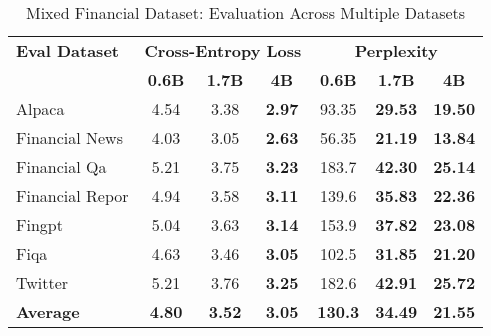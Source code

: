 
\begin{table}[h]
\centering
\caption[Mixed Financial: Evaluation Results]{Mixed Financial Dataset: Evaluation Across Multiple Datasets}
\label{tab:mixed_financial_results}
\begin{tabular}{l|ccc|ccc}
\hline
\textbf{Eval Dataset} & \multicolumn{3}{c|}{\textbf{Cross-Entropy Loss}} & \multicolumn{3}{c}{\textbf{Perplexity}} \\
\cline{2-4} \cline{5-7}
  & \textbf{0.6B} & \textbf{1.7B} & \textbf{4B} & \textbf{0.6B} & \textbf{1.7B} & \textbf{4B} \\
\hline
Alpaca & 4.54 & 3.38 & \textbf{2.97} & 93.35 & \textbf{29.53} & \textbf{19.50} \\
Financial News & 4.03 & 3.05 & \textbf{2.63} & 56.35 & \textbf{21.19} & \textbf{13.84} \\
Financial Qa & 5.21 & 3.75 & \textbf{3.23} & 183.7 & \textbf{42.30} & \textbf{25.14} \\
Financial Repor & 4.94 & 3.58 & \textbf{3.11} & 139.6 & \textbf{35.83} & \textbf{22.36} \\
Fingpt & 5.04 & 3.63 & \textbf{3.14} & 153.9 & \textbf{37.82} & \textbf{23.08} \\
Fiqa & 4.63 & 3.46 & \textbf{3.05} & 102.5 & \textbf{31.85} & \textbf{21.20} \\
Twitter & 5.21 & 3.76 & \textbf{3.25} & 182.6 & \textbf{42.91} & \textbf{25.72} \\
\hline
\textbf{Average} & \textbf{4.80} & \textbf{3.52} & \textbf{3.05} & \textbf{130.3} & \textbf{34.49} & \textbf{21.55} \\
\hline
\end{tabular}
\end{table}

